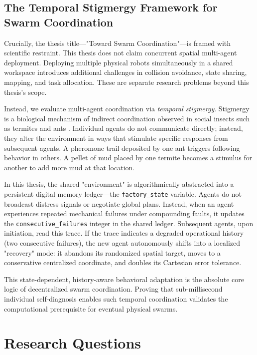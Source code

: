 ﻿\documentclass[12pt,a4paper,oneside]{report}
\begin{document}
\subsection{The Temporal Stigmergy Framework for Swarm Coordination}

Crucially, the thesis title---"Toward Swarm Coordination"---is framed with scientific restraint. This thesis does not claim concurrent spatial multi-agent deployment. Deploying multiple physical robots simultaneously in a shared workspace introduces additional challenges in collision avoidance, state sharing, mapping, and task allocation. These are separate research problems beyond this thesis's scope.

Instead, we evaluate multi-agent coordination via \textit{temporal stigmergy}. Stigmergy is a biological mechanism of indirect coordination observed in social insects such as termites and ants \cite{bongard2006resilient}. Individual agents do not communicate directly; instead, they alter the environment in ways that stimulate specific responses from subsequent agents. A pheromone trail deposited by one ant triggers following behavior in others. A pellet of mud placed by one termite becomes a stimulus for another to add more mud at that location.

In this thesis, the shared "environment" is algorithmically abstracted into a persistent digital memory ledger---the \texttt{factory\_state} variable. Agents do not broadcast distress signals or negotiate global plans. Instead, when an agent experiences repeated mechanical failures under compounding faults, it updates the \texttt{consecutive\_failures} integer in the shared ledger. Subsequent agents, upon initiation, read this trace. If the trace indicates a degraded operational history (two consecutive failures), the new agent autonomously shifts into a localized "recovery" mode: it abandons its randomized spatial target, moves to a conservative centralized coordinate, and doubles its Cartesian error tolerance.

This state-dependent, history-aware behavioral adaptation is the absolute core logic of decentralized swarm coordination. Proving that sub-millisecond individual self-diagnosis enables such temporal coordination validates the computational prerequisite for eventual physical swarms.

\section{Research Questions}
\end{document}
